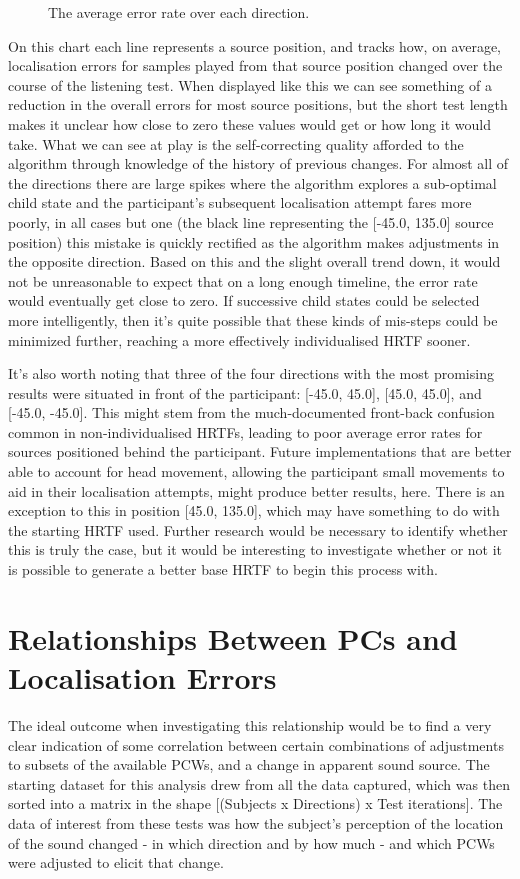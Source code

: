 \begin{figure}
	\caption{The average error rate over each direction.}
\end{figure}

On this chart each line represents a source position, and tracks how, on average, localisation errors for samples played from that source position changed over the course of the listening test. When displayed like this we can see something of a reduction in the overall errors for most source positions, but the short test length makes it unclear how close to zero these values would get or how long it would take. What we can see at play is the self-correcting quality afforded to the algorithm through knowledge of the history of previous changes. For almost all of the directions there are large spikes where the algorithm explores a sub-optimal child state and the participant's subsequent localisation attempt fares more poorly, in all cases but one (the black line representing the [-45.0, 135.0] source position) this mistake is quickly rectified as the algorithm makes adjustments in the opposite direction. Based on this and the slight overall trend down, it would not be unreasonable to expect that on a long enough timeline, the error rate would eventually get close to zero. If successive child states could be selected more intelligently, then it's quite possible that these kinds of mis-steps could be minimized further, reaching a more effectively individualised HRTF sooner.

It's also worth noting that three of the four directions with the most promising results were situated in front of the participant: [-45.0, 45.0], [45.0, 45.0], and [-45.0, -45.0]. This might stem from the much-documented front-back confusion common in non-individualised HRTFs, leading to poor average error rates for sources positioned behind the participant. Future implementations that are better able to account for head movement, allowing the participant small movements to aid in their localisation attempts, might produce better results, here. There is an exception to this in position [45.0, 135.0], which may have something to do with the starting HRTF used. Further research would be necessary to identify whether this is truly the case, but it would be interesting to investigate whether or not it is possible to generate a better base HRTF to begin this process with.

\section{Relationships Between PCs and Localisation Errors}
The ideal outcome when investigating this relationship would be to find a very clear indication of some correlation between certain combinations of adjustments to subsets of the available PCWs, and a change in apparent sound source. The starting dataset for this analysis drew from all the data captured, which was then sorted into a matrix in the shape [(Subjects x Directions) x Test iterations]. The data of interest from these tests was how the subject's perception of the location of the sound changed - in which direction and by how much - and which PCWs were adjusted to elicit that change. 

